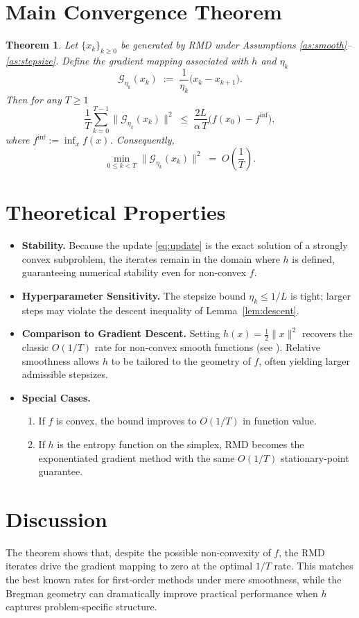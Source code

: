\documentclass{article}
\newtheorem{theorem}{Theorem}
\begin{document}
\section*{Main Convergence Theorem}
\begin{theorem}\label{thm:main}
Let $\{x_{k}\}_{k\ge0}$ be generated by RMD under Assumptions \ref{as:smooth}–\ref{as:stepsize}. Define the \emph{gradient mapping} associated with $h$ and $\eta_{k}$
\[
\mathcal{G}_{\eta_{k}}(x_{k})\;:=\;\frac{1}{\eta_{k}}\bigl(x_{k}-x_{k+1}\bigr).
\]
Then for any $T\ge1$
\[
\frac{1}{T}\sum_{k=0}^{T-1}\|\mathcal{G}_{\eta_{k}}(x_{k})\|^{2}
\;\le\;
\frac{2L}{\alpha\,T}\bigl(f(x_{0})-f^{\inf}\bigr),
\]
where $f^{\inf}:=\inf_{x}f(x)$. Consequently,
\[
\min_{0\le k<T}\|\mathcal{G}_{\eta_{k}}(x_{k})\|^{2}
\;=\;O\!\left(\frac{1}{T}\right).
\]
\end{theorem}

\section*{Theoretical Properties}
\begin{itemize}[leftmargin=*]
\item \textbf{Stability.} Because the update \eqref{eq:update} is the exact solution of a strongly convex subproblem, the iterates remain in the domain where $h$ is defined, guaranteeing numerical stability even for non‑convex $f$.
\item \textbf{Hyperparameter Sensitivity.} The stepsize bound $\eta_{k}\le1/L$ is tight; larger steps may violate the descent inequality of Lemma~\ref{lem:descent}.
\item \textbf{Comparison to Gradient Descent.} Setting $h(x)=\frac12\|x\|^{2}$ recovers the classic $O(1/T)$ rate for non‑convex smooth functions (see \cite{ghadimi2013stochastic}). Relative smoothness allows $h$ to be tailored to the geometry of $f$, often yielding larger admissible stepsizes.
\item \textbf{Special Cases.}
    \begin{enumerate}
        \item If $f$ is convex, the bound improves to $O(1/T)$ in function value.
        \item If $h$ is the entropy function on the simplex, RMD becomes the exponentiated gradient method with the same $O(1/T)$ stationary‑point guarantee.
    \end{enumerate}
\end{itemize}

\section*{Discussion}
The theorem shows that, despite the possible non‑convexity of $f$, the RMD iterates drive the gradient mapping to zero at the optimal $1/T$ rate. This matches the best known rates for first‑order methods under mere smoothness, while the Bregman geometry can dramatically improve practical performance when $h$ captures problem‑specific structure.
\end{document}
